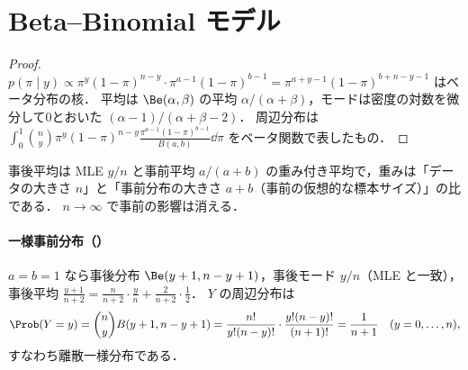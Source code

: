 \section{Beta--Binomial モデル}\label{sec:17-betabin}
\Hissu
{}
\begin{proof}
$p(\pi\mid y)\propto\pi^y(1-\pi)^{n-y}\cdot\pi^{a-1}(1-\pi)^{b-1}=\pi^{a+y-1}(1-\pi)^{b+n-y-1}$ はベータ分布の核．
平均は $\Be(\alpha,\beta)$ の平均 $\alpha/(\alpha+\beta)$，モードは密度の対数を微分して0とおいた $(\alpha-1)/(\alpha+\beta-2)$．
周辺分布は $\int_0^1\binom ny\pi^y(1-\pi)^{n-y}\frac{\pi^{a-1}(1-\pi)^{b-1}}{B(a,b)}\dd\pi$ をベータ関数で表したもの．
\end{proof}
事後平均は MLE $y/n$ と事前平均 $a/(a+b)$ の重み付き平均で，重みは「データの大きさ $n$」と「事前分布の大きさ $a+b$（事前の仮想的な標本サイズ）」の比である．
$n\to\infty$ で事前の影響は消える．

\paragraph{一様事前分布（）}
$a=b=1$ なら事後分布 $\Be(y+1,n-y+1)$，事後モード $y/n$（MLE と一致），事後平均 $\frac{y+1}{n+2}=\frac{n}{n+2}\cdot\frac yn+\frac{2}{n+2}\cdot\frac12$．
$Y$ の周辺分布は
\[
\Prob(Y=y)=\binom ny B(y+1,n-y+1)=\frac{n!}{y!(n-y)!}\cdot\frac{y!(n-y)!}{(n+1)!}=\frac{1}{n+1}\quad(y=0,\dots,n),
\]
すなわち離散一様分布である．

